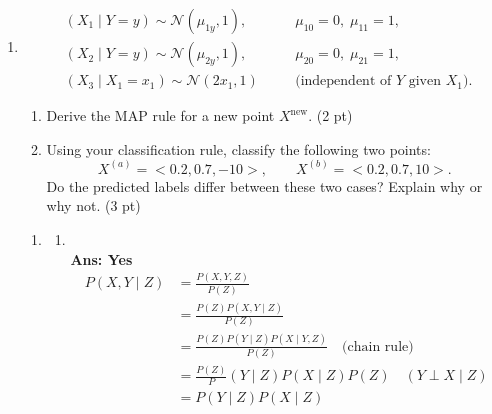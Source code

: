 \documentclass{article}
\theoremstyle{definition}
\theoremstyle{remark}
\newenvironment{Q}
        {%
          \clearpage
          \item
        }
        {%
          \phantom{s} %
          \bigskip
        }
\begin{document}
\begin{enumerate}[font={\Large\bfseries},left=0pt]
\begin{Q}
\begin{enumerate}
			      \[
				      \begin{aligned}
					       & (X_1 \mid Y=y) \sim \mathcal N(\mu_{1y},1), \quad &  & \mu_{10}=0,\;\mu_{11}=1,                 \\
					       & (X_2 \mid Y=y) \sim \mathcal N(\mu_{2y},1), \quad &  & \mu_{20}=0,\;\mu_{21}=1,                 \\
					       & (X_3 \mid X_1=x_1) \sim \mathcal N(2x_1,1)\quad   &  & \text{(independent of $Y$ given $X_1$).}
				      \end{aligned}
			      \]
			      \begin{enumerate}
				      \item Derive the MAP rule for a new point $X^{\text{new}}$. (2 pt)
				      \item Using your classification rule, classify the following two points:
				            \[
					            X^{(a)} = <0.2, 0.7,-10>,
					            \qquad
					            X^{(b)} = <0.2, 0.7 ,10>.
				            \]
				            Do the predicted labels differ between these two cases? Explain why or why not. (3 pt)
			      \end{enumerate}


		\end{enumerate}

	\end{Q}
	\begin{tcolorbox}
		\begin{enumerate}
			\item \begin{enumerate}
				      \item {}  \\
				            \textbf{Ans: Yes} \\
				            \begin{align}
					            P(X, Y \mid Z) & = \frac{P(X, Y, Z)}{P(Z)}                                              \\
					                           & = \frac{P(Z)P(X, Y \mid Z)}{P(Z)}                                      \\
					                           & = \frac{P(Z)P(Y \mid Z)P(X \mid Y, Z)}{P(Z)} \quad \text{(chain rule)} \\
					                           & = \frac{P(Z)}P(Y \mid Z)P(X \mid Z){P(Z)} \quad (Y \perp X \mid Z)     \\
					                           & = P(Y \mid Z)P(X \mid Z)                                               \\
				            \end{align}


\end{enumerate}
\end{enumerate}
\end{tcolorbox}
\end{enumerate}
\end{document}
